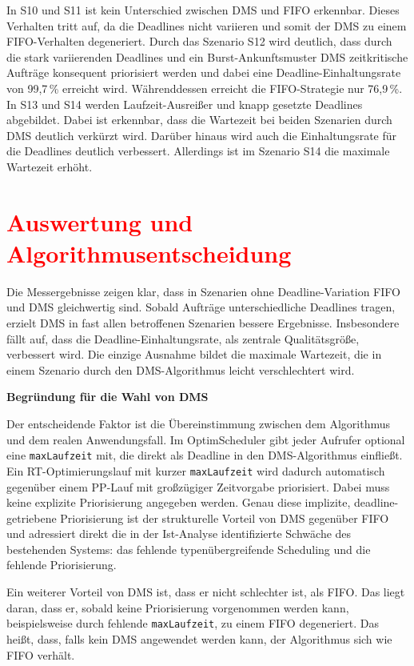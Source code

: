\documentclass[
    12pt,               
    a4paper,            
    ngerman,            
    parskip=half,       
    headings=normal,   
    numbers=enddot,     
    toc=chapterentrywithdots 
]{scrreprt}\usepackage[utf8]{inputenc}
\begin{document}
In S10 und S11 ist kein Unterschied zwischen DMS und FIFO erkennbar. Dieses Verhalten tritt auf, da die Deadlines nicht variieren und somit der DMS zu einem FIFO-Verhalten degeneriert. Durch das Szenario S12 wird deutlich, dass durch die stark variierenden Deadlines und ein Burst-Ankunftsmuster DMS zeitkritische Aufträge konsequent priorisiert werden und dabei eine Deadline-Einhaltungsrate von 99,7\,\% erreicht wird. Währenddessen erreicht die FIFO-Strategie nur 76,9\,\%. In S13 und S14 werden Laufzeit-Ausreißer und knapp gesetzte Deadlines abgebildet. Dabei ist erkennbar, dass die Wartezeit bei beiden Szenarien durch DMS deutlich verkürzt wird. Darüber hinaus wird auch die Einhaltungsrate für die Deadlines deutlich verbessert. Allerdings ist im Szenario S14 die maximale Wartezeit erhöht.

\section{\textcolor{red}{Auswertung und Algorithmusentscheidung}}
Die Messergebnisse zeigen klar, dass in Szenarien ohne Deadline-Variation FIFO und DMS gleichwertig sind. Sobald Aufträge unterschiedliche Deadlines tragen, erzielt DMS in fast allen betroffenen Szenarien bessere Ergebnisse. Insbesondere fällt auf, dass die Deadline-Einhaltungsrate, als zentrale Qualitätsgröße, verbessert wird. Die einzige Ausnahme bildet die maximale Wartezeit, die in einem Szenario durch den DMS-Algorithmus leicht verschlechtert wird. 

\newpage
\textbf{Begründung für die Wahl von DMS}

Der entscheidende Faktor ist die Übereinstimmung zwischen dem Algorithmus und dem realen Anwendungsfall. Im OptimScheduler gibt jeder Aufrufer optional eine \texttt{maxLaufzeit} mit, die direkt als Deadline in den DMS-Algorithmus einfließt. Ein RT-Optimierungslauf mit kurzer \texttt{maxLaufzeit} wird dadurch automatisch gegenüber einem PP-Lauf mit großzügiger Zeitvorgabe priorisiert. Dabei muss keine explizite Priorisierung angegeben werden. Genau diese implizite, deadline-getriebene Priorisierung ist der strukturelle Vorteil von DMS gegenüber FIFO und adressiert direkt die in der Ist-Analyse identifizierte Schwäche des bestehenden Systems: das fehlende typenübergreifende Scheduling und die fehlende Priorisierung.

Ein weiterer Vorteil von DMS ist, dass er nicht schlechter ist, als FIFO. Das liegt daran, dass er, sobald keine Priorisierung vorgenommen werden kann, beispielsweise durch fehlende \texttt{maxLaufzeit}, zu einem FIFO degeneriert. Das heißt, dass, falls kein DMS angewendet werden kann, der Algorithmus sich wie FIFO verhält.
\end{document}
